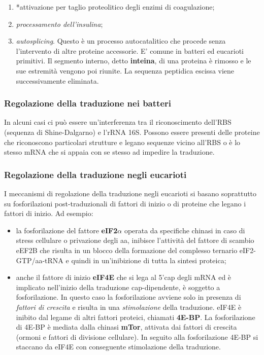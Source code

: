 \documentclass[]{article}
\begin{document}
\begin{itemize}
  \begin{enumerate}
  \def\labelenumi{\arabic{enumi}.}
  \itemsep1pt\parskip0pt
  \item
    *attivazione per taglio proteolitico degli enzimi di coagulazione;
  \item
    \emph{processamento dell'insulina};
  \item
    \emph{autosplicing}. Questo è un processo autocatalitico che procede
    senza l'intervento di altre proteine accessorie. E' comune in
    batteri ed eucarioti primitivi. Il segmento interno, detto
    \textbf{inteina}, di una proteina è rimosso e le sue estremità
    vengono poi riunite. La sequenza peptidica escissa viene
    successivamente eliminata.
  \end{enumerate}
\end{itemize}

\subsubsection{Regolazione della traduzione nei
batteri}\label{regolazione-della-traduzione-nei-batteri}

In alcuni casi ci può essere un'interferenza tra il riconoscimento
dell'RBS (sequenza di Shine-Dalgarno) e l'rRNA 16S. Possono essere
presenti delle proteine che riconoscono particolari strutture e legano
sequenze vicino all'RBS o è lo stesso mRNA che si appaia con se stesso
ad impedire la traduzione.

\subsubsection{Regolazione della traduzione negli
eucarioti}\label{regolazione-della-traduzione-negli-eucarioti}

I meccanismi di regolazione della traduzione negli eucarioti si basano
soprattutto su fosforilazioni post-traduzionali di fattori di inizio o
di proteine che legano i fattori di inizio. Ad esempio:

\begin{itemize}
\itemsep1pt\parskip0pt
\item
  la fosforilazione del fattore \textbf{eIF2\(\alpha\)} operata da
  specifiche chinasi in caso di stress cellulare o privazione degli aa,
  inibisce l'attività del fattore di scambio eEF2B che risulta in un
  blocco della formazione del complesso ternario eIF2-GTP/aa-tRNA e
  quindi in un'inibizione di tutta la sintesi proteica;
\item
  anche il fattore di inizio \textbf{eIF4E} che si lega al 5'cap degli
  mRNA ed è implicato nell'inizio della traduzione cap-dipendente, è
  soggetto a fosforilazione. In questo caso la fosforilazione avviene
  solo in presenza di \emph{fattori di crescita} e risulta in una
  \emph{stimolazione} della traduzione. eIF4E è inibito dal legame di
  altri fattori proteici, chiamati \textbf{4E-BP}. La fosforilazione di
  4E-BP è mediata dalla chinasi \textbf{mTor}, attivata dai fattori di
  crescita (ormoni e fattori di divisione cellulare). In seguito alla
  fosforilazione 4E-BP si staccano da eIF4E con conseguente stimolazione
  della traduzione.
\end{itemize}
\end{document}
